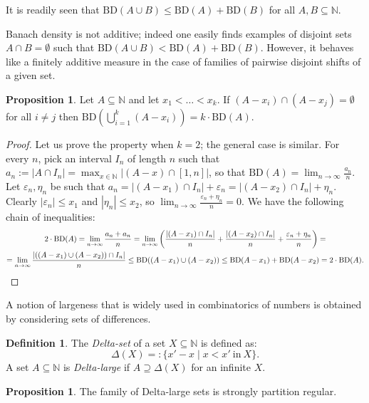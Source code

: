 \documentclass[a4paper,oneside]{article}
\newcommand{\N}{\mathbb{N}}
\theoremstyle{definition}
\newtheorem{proposition}[theorem]{Proposition}
\newtheorem{definition}[theorem]{Definition}
\theoremstyle{named}
\begin{document}
It is readily seen that
$\text{BD}(A\cup B)\le\text{BD}(A)+\text{BD}(B)$ for all $A,B\subseteq\N$.

Banach density is not additive; indeed one easily finds
examples of disjoint sets $A\cap B=\emptyset$ such that
$\text{BD}(A\cup B)<\text{BD}(A)+\text{BD}(B)$.
However, it behaves like a finitely additive measure in the case
of families of pairwise disjoint shifts of a given set.

\begin{proposition}\label{BDadditivity}
Let $A\subseteq\N$ and let $x_1<\ldots<x_k$.
If $(A-x_i)\cap(A-x_j)=\emptyset$ for all $i\ne j$
then $\text{BD}\left(\bigcup_{i=1}^k(A-x_i)\right)=
k\cdot\text{BD}(A)$.
\end{proposition}

\begin{proof}
Let us prove the property when $k=2$; the general case is similar.
For every $n$, pick an interval $I_n$ of length $n$ such that
$a_n:=|A\cap I_n|=\max_{x\in\N}|(A-x)\cap[1,n]|$, so that $\text{BD}(A)=\lim_{n\to\infty}\frac{a_n}{n}$.
Let $\varepsilon_n,\eta_n$ be such that $a_n=|(A-x_1)\cap I_n|+\varepsilon_n=|(A-x_2)\cap I_n|+\eta_n$.
Clearly $|\varepsilon_n|\le x_1$ and $|\eta_n|\le x_2$, so $\lim_{n\to\infty}\frac{\varepsilon_n+\eta_n}{n}=0$.
We have the following chain of inequalities:
\begin{multline*}
2\cdot\text{BD}(A)=\lim_{n\to\infty}\frac{a_n+a_n}{n}=
\lim_{n\to\infty}\left(\frac{|(A-x_1)\cap I_n|}{n}+\frac{|(A-x_2)\cap I_n|}{n}+\frac{\varepsilon_n+\eta_n}{n}\right)=
\\
=\lim_{n\to\infty}\frac{|((A-x_1)\cup(A-x_2))\cap I_n|}{n}\le
\text{BD}((A-x_1)\cup(A-x_2))\le
\text{BD}(A-x_1)+\text{BD}(A-x_2)=2\cdot\text{BD}(A).\qedhere
\end{multline*}
\end{proof}

A notion of largeness that is widely used in combinatorics of numbers is 
obtained by considering sets of differences.

\begin{definition}
{\rm The \emph{Delta-set} of a set $X\subseteq\N$ is defined as:
$$\Delta(X)=:\{x'-x\mid x<x'\ \text{in}\ X\}.$$
A set $A\subseteq\N$ is \emph{Delta-large} if $A\supseteq\Delta(X)$
for an infinite $X$.}
\end{definition}

\begin{proposition}
The family of Delta-large sets is strongly partition regular.
\end{proposition}
\end{document}
